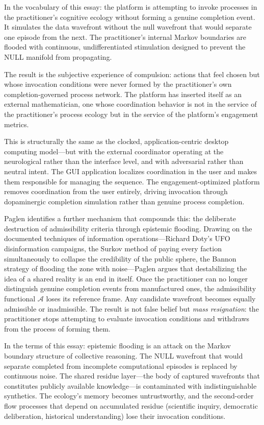 \documentclass[12pt, a4paper]{article}
\begin{document}
In the vocabulary of this essay: the platform is attempting to
invoke processes in the practitioner's cognitive ecology without
forming a genuine completion event. It simulates the data
wavefront without the null wavefront that would separate one
episode from the next. The practitioner's internal Markov
boundaries are flooded with continuous, undifferentiated
stimulation designed to prevent the NULL manifold from
propagating.

The result is the subjective experience of compulsion: actions
that feel chosen but whose invocation conditions were never
formed by the practitioner's own completion-governed process
network. The platform has inserted itself as an external
mathematician, one whose coordination behavior is not in the
service of the practitioner's process ecology but in the service
of the platform's engagement metrics.

This is structurally the same as the clocked, application-centric
desktop computing model---but with the external coordinator
operating at the neurological rather than the interface level,
and with adversarial rather than neutral intent. The GUI
application localizes coordination in the user and makes them
responsible for managing the sequence. The engagement-optimized
platform removes coordination from the user entirely, driving
invocation through dopaminergic completion simulation rather than
genuine process completion.

Paglen identifies a further mechanism that compounds this: the
deliberate destruction of admissibility criteria through
epistemic flooding. Drawing on the documented techniques of
information operations---Richard Doty's UFO disinformation
campaigns, the Surkov method of paying every faction
simultaneously to collapse the credibility of the public sphere,
the Bannon strategy of flooding the zone with noise---Paglen
argues that destabilizing the idea of a shared reality is an
end in itself. Once the practitioner can no longer distinguish
genuine completion events from manufactured ones, the
admissibility functional $\mathcal{A}$ loses its reference
frame. Any candidate wavefront becomes equally admissible or
inadmissible. The result is not false belief but \emph{mass
resignation}: the practitioner stops attempting to evaluate
invocation conditions and withdraws from the process of
forming them.

In the terms of this essay: epistemic flooding is an attack on
the Markov boundary structure of collective reasoning. The NULL
wavefront that would separate completed from incomplete
computational episodes is replaced by continuous noise. The
shared residue layer---the body of captured wavefronts that
constitutes publicly available knowledge---is contaminated with
indistinguishable synthetics. The ecology's memory becomes
untrustworthy, and the second-order flow processes that depend
on accumulated residue (scientific inquiry, democratic
deliberation, historical understanding) lose their invocation
conditions.
\end{document}
